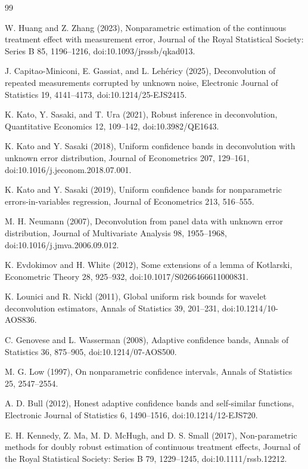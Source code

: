 \documentclass{article}
\begin{document}
\begin{thebibliography}{99}

   W. Huang and Z. Zhang (2023), Nonparametric estimation of the continuous treatment effect with measurement error, Journal of the Royal Statistical Society: Series B 85, 1196--1216, doi:10.1093/jrsssb/qkad013.

   J. Capitao-Miniconi, E. Gassiat, and L. Lehéricy (2025), Deconvolution of repeated measurements corrupted by unknown noise, Electronic Journal of Statistics 19, 4141--4173, doi:10.1214/25-EJS2415.

   K. Kato, Y. Sasaki, and T. Ura (2021), Robust inference in deconvolution, Quantitative Economics 12, 109--142, doi:10.3982/QE1643.

   K. Kato and Y. Sasaki (2018), Uniform confidence bands in deconvolution with unknown error distribution, Journal of Econometrics 207, 129--161, doi:10.1016/j.jeconom.2018.07.001.

   K. Kato and Y. Sasaki (2019), Uniform confidence bands for nonparametric errors-in-variables regression, Journal of Econometrics 213, 516--555.

   M. H. Neumann (2007), Deconvolution from panel data with unknown error distribution, Journal of Multivariate Analysis 98, 1955--1968, doi:10.1016/j.jmva.2006.09.012.

   K. Evdokimov and H. White (2012), Some extensions of a lemma of Kotlarski, Econometric Theory 28, 925--932, doi:10.1017/S0266466611000831.

   K. Lounici and R. Nickl (2011), Global uniform risk bounds for wavelet deconvolution estimators, Annals of Statistics 39, 201--231, doi:10.1214/10-AOS836.

   C. Genovese and L. Wasserman (2008), Adaptive confidence bands, Annals of Statistics 36, 875--905, doi:10.1214/07-AOS500.

   M. G. Low (1997), On nonparametric confidence intervals, Annals of Statistics 25, 2547--2554.

   A. D. Bull (2012), Honest adaptive confidence bands and self-similar functions, Electronic Journal of Statistics 6, 1490--1516, doi:10.1214/12-EJS720.

   E. H. Kennedy, Z. Ma, M. D. McHugh, and D. S. Small (2017), Non-parametric methods for doubly robust estimation of continuous treatment effects, Journal of the Royal Statistical Society: Series B 79, 1229--1245, doi:10.1111/rssb.12212.


\end{thebibliography}
\end{document}
